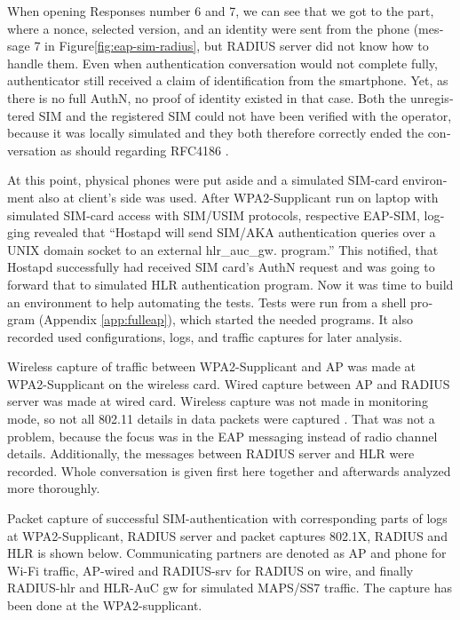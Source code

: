 \documentclass[12pt,a4paper,english]{tutthesis}
\begin{document}
\begin{otherlanguage}{english}
When opening Responses number 6 and 7, we can see that we got to the
part, where a nonce, selected version, and an identity were sent from
the phone (message 7 in Figure\ref{fig:eap-sim-radius}, but RADIUS server
did not know how to handle them.
 Even when authentication conversation would not complete fully,
authenticator still received a claim of identification from the
smartphone. Yet, as there is no full AuthN, no proof of identity existed in
that case.
Both the unregistered SIM and the registered SIM could not have been
verified with the
operator, because it was locally simulated and they both therefore
correctly  ended the conversation as should regarding
RFC4186 \cite{rfc4186}.

At this point, physical phones were put aside and a simulated SIM-card
environment also at client's  side was used.
After WPA2-Supplicant run on laptop with simulated SIM-card access 
with SIM/USIM protocols, respective EAP-SIM, logging revealed that
``Hostapd will send SIM/AKA authentication queries over a UNIX domain socket to an external hlr\_auc\_gw.
program.''
This notified, that Hostapd successfully had received SIM
card's AuthN request and was going to forward that to simulated HLR
authentication program. Now it was time to build an
environment to help automating the tests.
Tests were run from a shell program (Appendix \ref{app:fulleap}), which
started the needed programs. It also recorded used configurations, logs,
and traffic captures for later analysis.



Wireless capture of traffic between WPA2-Supplicant and AP was made at
WPA2-Supplicant on the wireless card. Wired capture between AP and
RADIUS server was made at wired card. Wireless capture was
not made in monitoring mode, so not all 802.11 details in
data packets were captured \cite{wireshark-capture}.
That was not a problem, because the focus was 
in the EAP messaging instead of radio channel details.
Additionally, the messages between RADIUS server and HLR were recorded.
Whole conversation is given first here together and afterwards analyzed more
thoroughly.



Packet capture of successful SIM-authentication with corresponding
parts of logs at WPA2-Supplicant, RADIUS server and packet captures
802.1X, RADIUS and HLR is shown below.  Communicating partners are
denoted as AP and phone for Wi-Fi traffic, AP-wired and
RADIUS-srv for RADIUS on wire, and finally RADIUS-hlr and HLR-AuC gw
for simulated MAPS/SS7 traffic.
The capture has been done at the WPA2-supplicant.


\end{otherlanguage}
\end{document}

